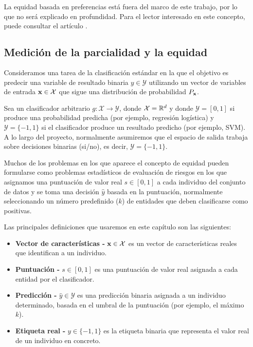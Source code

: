 \documentclass[oneside,openright,titlepage,numbers=noenddot,openany,headinclude,footinclude=true,
cleardoublepage=empty,abstractoff,BCOR=5mm,paper=a4,fontsize=12pt,main=spanish]{scrreprt}
\begin{document}
La equidad basada en preferencias está fuera del marco de este trabajo, por lo que no será explicado en profundidad. Para el lector interesado en este concepto, puede consultar el artículo \cite{preferences2017}.

\subsection{Medición de la parcialidad y la equidad}

Consideramos una tarea de la clasificación estándar en la que el objetivo es predecir una variable de resultado binaria $y \in \mathcal{Y}$ utilizando un vector de variables de entrada $\textbf{x} \in \mathcal{X}$ que sigue una distribución de probabilidad $P_{\textbf{x}}$.

Sea un clasificador arbitrario $g:\mathcal{X} \rightarrow \mathcal{Y}$, donde $\mathcal{X}=\mathbb{R}^d$ y donde $\mathcal{Y}=[0,1]$ si produce una probabilidad predicha (por ejemplo, regresión logística) y $\mathcal{Y}=\{-1,1\}$ si el clasificador produce un resultado predicho (por ejemplo, SVM). A lo largo del proyecto, normalmente asumiremos que el espacio de salida trabaja sobre decisiones binarias (si/no), es decir, $\mathcal{Y}=\{-1,1\}$.

Muchos de los problemas en los que aparece el concepto de equidad pueden formularse como problemas estadísticos de evaluación de riesgos en los que asignamos una puntuación de valor real $s \in [0,1]$ a cada individuo del conjunto de datos y se toma una decisión $\hat{y}$
basada en la puntuación, normalmente seleccionando un número predefinido ($k$) de
entidades que deben clasificarse como positivas.

Las principales definiciones que usaremos en este capítulo son las siguientes:

\begin{itemize}
    \item \textbf{Vector de características -} $\textbf{x}\in \mathcal{X}$ es un vector de características reales que identifican a un individuo.
    \item \textbf{Puntuación -} $s \in [0,1]$ es una puntuación de valor real asignada a cada entidad por el clasificador.
    \item \textbf{Predicción -} $\hat{y} \in \mathcal{Y}$ es una predicción binaria asignada a un individuo determinado, basada en el umbral de la puntuación (por ejemplo, el máximo $k$).
    \item \textbf{Etiqueta real -} $y \in \{-1,1\}$ es la etiqueta binaria que representa el valor real de un individuo en concreto.
\end{itemize}
\end{document}
